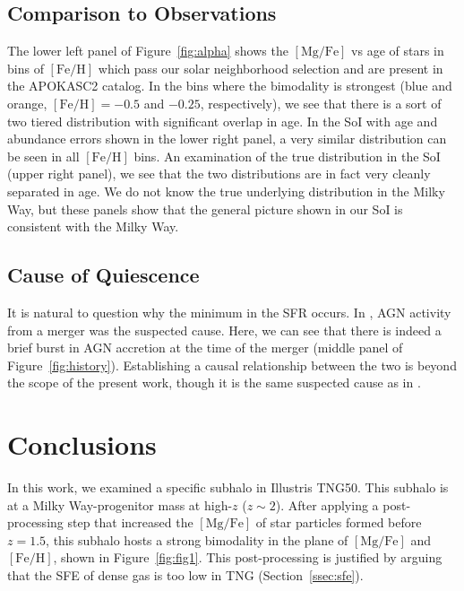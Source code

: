 \documentclass[linenumbers, twocolumn]{aastex631}
\newcommand{\FeH}{\ensuremath{[\textrm{Fe}/\textrm{H}]}}
\newcommand{\MgFe}{\ensuremath{[\textrm{Mg}/\textrm{Fe}]}}
\begin{document}
\subsection{Comparison to Observations}\label{ssec:compare_obs}
The lower left panel of Figure~\ref{fig:alpha} shows the \MgFe{} vs age of stars in bins of \FeH{} which pass our solar neighborhood selection and are present in the APOKASC2 catalog. In the bins where the bimodality is strongest (blue and orange, $\FeH=-0.5$ and $-0.25$, respectively), we see that there is a sort of two tiered distribution with significant overlap in age. In the SoI with age and abundance errors shown in the lower right panel, a very similar distribution can be seen in all \FeH{} bins. An examination of the true distribution in the SoI (upper right panel), we see that the two distributions are in fact very cleanly separated in age. We do not know the true underlying distribution in the Milky Way, but these panels show that the general picture shown in our SoI is consistent with the Milky Way.

\subsection{Cause of Quiescence}\label{ssec:cause_qui}
It is natural to question why the minimum in the SFR occurs. In \citet{2024arXiv240707985B}, AGN activity from a merger was the suspected cause. Here, we can see that there is indeed a brief burst in AGN accretion at the time of the merger (middle panel of Figure~\ref{fig:history}). Establishing a causal relationship between the two is beyond the scope of the present work, though it is the same suspected cause as in \citet{2024arXiv240707985B}.


\section{Conclusions}\label{sec:conc}
In this work, we examined a specific subhalo in Illustris TNG50. This subhalo is at a Milky Way-progenitor mass at high-$z$ ($z\sim2$). After applying a post-processing step that increased the \MgFe{} of star particles formed before $z=1.5$, this subhalo hosts a strong bimodality in the plane of \MgFe{} and \FeH{}, shown in Figure~\ref{fig:fig1}. This post-processing is justified by arguing that the SFE of dense gas is too low in TNG (Section~\ref{ssec:sfe}).
\end{document}
